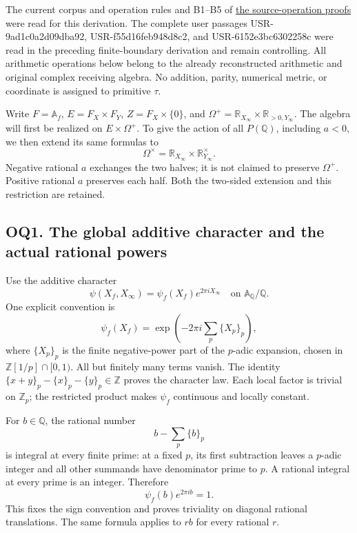 The current {corpus and operation
rules} and B1--B5 of
\href{https://github.com/KokunoYumeto/zeta-function-research-reader/blob/main/workbenches/splitzero-tandem/continuations/20260924-cohomology-weight-and-character-lifts/original-character-lifting/foundations/user_definitions_20260924/SOURCE_OPERATIONS_AND_PROOFS.md}{the
source-operation proofs} were read for this derivation. The complete
user passages USR-9ad1c0a2d09dba92, USR-f55d16feb948d8c2, and
USR-6152e3bc6302258c were read in the preceding finite-boundary
derivation and remain controlling. All arithmetic operations below
belong to the already reconstructed arithmetic and original complex
receiving algebra. No addition, parity, numerical metric, or coordinate
is assigned to primitive \(\tau\).

Write \(F=\mathbb A_f\), \(E=F_X\times F_Y\), \(Z=F_X\times\{0\}\), and
\(\Omega^+=\mathbb R_{X_\infty}\times\mathbb R_{>0,Y_\infty}\). The
algebra will first be realized on \(E\times\Omega^+\). To give the
action of all \(P(\mathbb Q)\), including \(a<0\), we then extend its
same formulas to \[
\Omega^\times=\mathbb R_{X_\infty}\times\mathbb R^\times_{Y_\infty}.
\tag{OQ0.3}
\] Negative rational \(a\) exchanges the two halves; it is not claimed
to preserve \(\Omega^+\). Positive rational \(a\) preserves each half.
Both the two-sided extension and this restriction are retained.

\subsection{OQ1. The global additive character and the actual rational
powers}\label{oq1.-the-global-additive-character-and-the-actual-rational-powers}

Use the additive character \[
\psi(X_f,X_\infty)=\psi_f(X_f)e^{2\pi iX_\infty}
\quad\text{on }\mathbb A_{\mathbb Q}/\mathbb Q.
\tag{OQ1.1}
\] One explicit convention is \[
\psi_f(X_f)=
\exp\!\left(-2\pi i\sum_p\{X_p\}_p\right),
\tag{OQ1.2}
\] where \(\{X_p\}_p\) is the finite negative-power part of the
\(p\)-adic expansion, chosen in \(\mathbb Z[1/p]\cap[0,1)\). All but
finitely many terms vanish. The identity
\(\{x+y\}_p-\{x\}_p-\{y\}_p\in\mathbb Z\) proves the character law. Each
local factor is trivial on \(\mathbb Z_p\); the restricted product makes
\(\psi_f\) continuous and locally constant.

For \(b\in\mathbb Q\), the rational number \[
b-\sum_p\{b\}_p
\] is integral at every finite prime: at a fixed \(p\), its first
subtraction leaves a \(p\)-adic integer and all other summands have
denominator prime to \(p\). A rational integral at every prime is an
integer. Therefore \[
\psi_f(b)e^{2\pi ib}=1.
\tag{OQ1.3}
\] This fixes the sign convention and proves triviality on diagonal
rational translations. The same formula applies to \(rb\) for every
rational \(r\).

